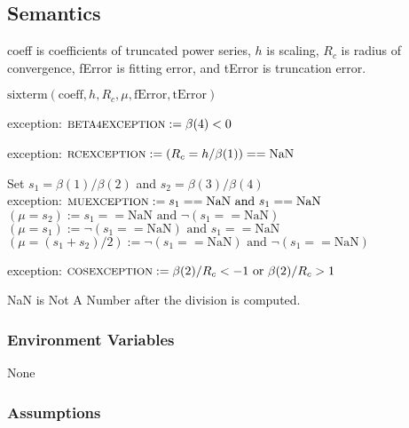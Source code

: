\documentclass[12pt, titlepage]{article}
\begin{document}
\subsection{Semantics}

coeff is coefficients of truncated power series,
$h$ is scaling,
$R_c$ is radius of convergence,
fError is fitting error, and
tError is truncation error.

\vspace{.3cm}

\Ni $\text{sixterm}( \text{coeff}, h, R_c, \mu, \text{fError}, \text{tError})$

\vspace{.3cm}

\Ni exception: $\text{\footnotesize BETA4EXCEPTION} := \beta(4)<0$

\vspace{.3cm}

\Ni exception: $\text{\footnotesize RCEXCEPTION} := (R_c = h/\beta(1)) == \text{NaN}$

\vspace{.3cm}
Set $s_1 = \beta(1)/\beta(2)$ and $s_2 = \beta(3)/\beta(4)$\\
\Ni exception: $\text{\footnotesize MUEXCEPTION} :=  s_1 == \text{NaN}  \text{ and } s_1 == \text{NaN}$\\
\Ni $(\mu = s_2) := s_1 == \text{NaN}  \text{ and } \neg (s_1 == \text{NaN})$\\
\Ni $(\mu = s_1) := \neg(s_1 == \text{NaN}) \text{ and } s_1 == \text{NaN}$\\
\Ni $(\mu = (s_1+s_2)/2) := \neg(s_1 == \text{NaN})  \text{ and }  \neg(s_1 == \text{NaN})$

\vspace{.3cm}

\Ni exception: $\text{\footnotesize COSEXCEPTION} :=  \beta(2)/ R_c < -1 \text{ or } \beta(2)/ R_c > 1$

\vspace{.3cm}

\Ni NaN is Not A Number after the division is computed.

\subsubsection{Environment Variables}

None

\subsubsection{Assumptions}
\end{document}
